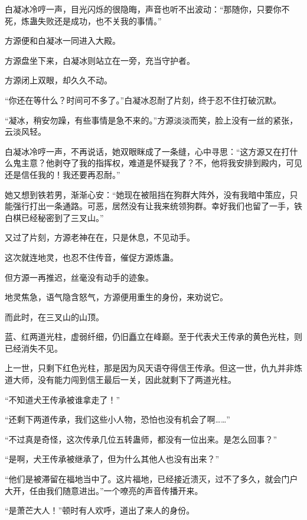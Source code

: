 \begin{this_body}
白凝冰冷哼一声，目光闪烁的很隐晦，声音也听不出波动：“那随你，只要你不死，炼蛊失败还是成功，也不关我的事情。”

方源便和白凝冰一同进入大殿。

方源盘坐下来，白凝冰则站立在一旁，充当守护者。

方源闭上双眼，却久久不动。

“你还在等什么？时间可不多了。”白凝冰忍耐了片刻，终于忍不住打破沉默。

“凝冰，稍安勿躁，有些事情是急不来的。”方源淡淡而笑，脸上没有一丝的紧张，云淡风轻。

白凝冰冷哼一声，不再说话，她双眼眯成了一条缝，心中寻思：“这方源又在打什么鬼主意？他剥夺了我的指挥权，难道是怀疑我了？不，他将我安排到殿内，可见还是信任我的！我还要再忍耐。”

她又想到铁若男，渐渐心安：“她现在被阻挡在狗群大阵外，没有我暗中策应，只能强行打出一条通路。可恶，居然没有让我来统领狗群。幸好我们也留了一手，铁白棋已经秘密到了三叉山。”

又过了片刻，方源老神在在，只是休息，不见动手。

这次就连地灵，也忍不住传音，催促方源炼蛊。

但方源一再推迟，丝毫没有动手的迹象。

地灵焦急，语气隐含怒气，方源便用重生的身份，来劝说它。

而此时，在三叉山的山顶。

蓝、红两道光柱，虚弱纤细，仍旧矗立在峰巅。至于代表犬王传承的黄色光柱，则已经消失不见。

上一世，只剩下红色光柱，那是因为风天语夺得信王传承。但这一世，仇九并非炼道大师，没有能力闯到信王最后一关，因此就剩下了两道光柱。

“不知道犬王传承被谁拿走了！”

“还剩下两道传承，我们这些小人物，恐怕也没有机会了啊……”

“不过真是奇怪，这次传承几位五转蛊师，都没有一位出来。是怎么回事？”

“是啊，犬王传承被继承了，但为什么其他人也没有出来？”

“他们是被滞留在福地当中了。这片福地，已经接近溃灭，过不了多久，就会门户大开，任由我们随意进出。”一个嘹亮的声音传播开来。

“是萧芒大人！”顿时有人欢呼，道出了来人的身份。

\end{this_body}

